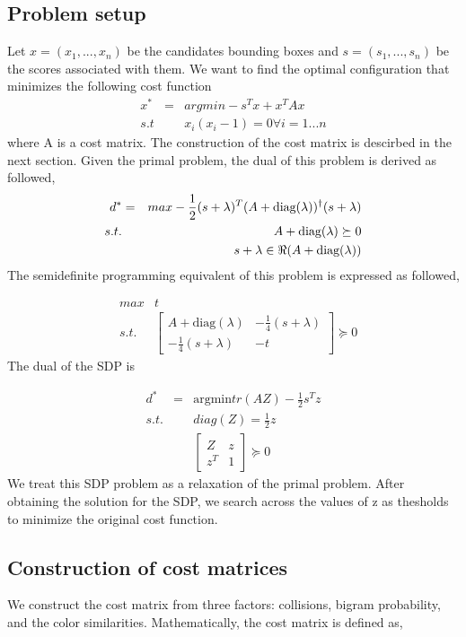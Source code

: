 \documentclass[10pt,twocolumn,letterpaper]{article}
\begin{document}
\subsection{Problem setup}

Let $x=(x_{1},...,x_{n})$ be the candidates bounding boxes and $s=(s_{1},...,s_{n})$
be the scores associated with them. We want to find the optimal configuration
that minimizes the following cost function
\begin{eqnarray*}
x^{*} & = & argmin-s^{T}x+x^{T}Ax\\
s.t &  & x_{i}(x_{i}-1)=0\forall i=1...n
\end{eqnarray*}
where A is a cost matrix. The construction of the cost matrix is descirbed in the next section. Given the primal problem, the dual of this problem is derived as followed,
\begin{eqnarray*}
d^{*} & = & max-\frac{1}{2}(s+\lambda)^{T}(A+\mbox{diag}(\lambda))^{\dagger}(s+\lambda)\\
s.t. &  & A+\mbox{diag}(\lambda)\succeq0\\
 &  & s+\lambda\in\Re(A+\mbox{diag(\ensuremath{\lambda}))}
\end{eqnarray*}
The semidefinite programming equivalent of this problem is expressed as followed,

\begin{eqnarray*}
& max & t\\
 & s.t. & \left[\begin{array}{cc}
A+\mbox{diag}(\lambda) & -\frac{1}{4}(s+\lambda)\\
-\frac{1}{4}(s+\lambda) & -t
\end{array}\right]\succeq0
\end{eqnarray*}
The dual of the SDP is

\begin{eqnarray*}
d^{*} & = & \mbox{argmin} tr(AZ)-\frac{1}{2}s^{T}z\\
s.t. &  & diag(Z)=\frac{1}{2}z\\
 &  & \left[\begin{array}{cc}
Z & z\\
z^{T} & 1
\end{array}\right]\succeq0
\end{eqnarray*}
We treat this SDP problem as a relaxation of the primal problem. After obtaining the solution for the SDP, we search across the values of z as thesholds to minimize the original cost function.
\subsection{Construction of cost matrices}
We construct the cost matrix from three factors: collisions, bigram probability, and the color similarities. Mathematically, the cost matrix is defined as,
\end{document}
